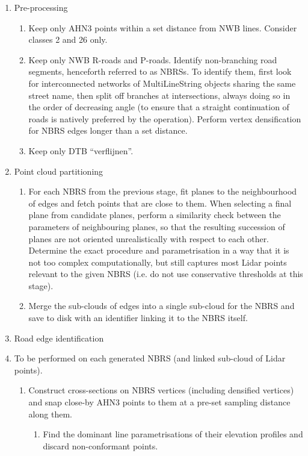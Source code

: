 \begin{enumerate}
    \item Pre-processing
    \begin{enumerate}
        \item Keep only AHN3 points within a set distance from NWB lines. Consider classes 2 and 26 only.
        \item Keep only NWB R-roads and P-roads. Identify non-branching road segments, henceforth referred to as NBRSs. To identify them, first look for interconnected networks of MultiLineString objects sharing the same street name, then split off branches at intersections, always doing so in the order of decreasing angle (to ensure that a straight continuation of roads is natively preferred by the operation). Perform vertex densification for NBRS edges longer than a set distance.
        \item Keep only DTB “verflijnen”.
    \end{enumerate}
    \item Point cloud partitioning
    \begin{enumerate}
        \item For each NBRS from the previous stage, fit planes  to the neighbourhood of edges  and fetch  points that are close to them. When selecting a final plane from candidate planes, perform a similarity check between the parameters of neighbouring planes, so that the resulting succession of planes are not oriented unrealistically with respect to each other. Determine the exact procedure and parametrisation in a way that it is not too complex computationally, but still captures most Lidar points relevant to the given NBRS (i.e. do not use conservative thresholds at this stage).
        \item Merge the sub-clouds of edges into a single sub-cloud for the NBRS and save to disk with an identifier linking it to the NBRS itself.
    \end{enumerate}
    \item Road edge identification
    \item[] To be performed on each generated NBRS (and linked sub-cloud of Lidar points).
        \begin{enumerate}
            \item Construct cross-sections on NBRS vertices (including densified vertices) and snap close-by AHN3 points to them at a pre-set sampling distance along them.
            \begin{enumerate}
                \item Find the dominant line parametrisations of their elevation profiles and discard non-conformant points.

\end{enumerate}
\end{enumerate}
\end{enumerate}
